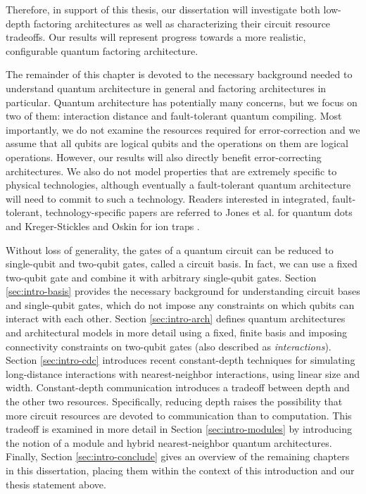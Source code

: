  Therefore,
in support of this thesis,
our dissertation will investigate both low-depth factoring architectures
as well as characterizing their circuit resource tradeoffs.
Our results will represent progress towards a more realistic, configurable
quantum factoring architecture.


The remainder of this chapter is devoted to the necessary background needed
to understand quantum architecture in general and factoring architectures
in particular. Quantum architecture has potentially many concerns, but we
focus on two of them: interaction distance and fault-tolerant quantum compiling.
Most importantly, we do not examine the resources required for error-correction
and we assume that all qubits are logical qubits and the operations on them
are logical operations. However, our results will also directly benefit
error-correcting architectures. We also do not model properties that are extremely
specific to physical technologies, although eventually a
fault-tolerant quantum architecture will need to commit to such a technology.
Readers interested in integrated, fault-tolerant,
technology-specific papers are referred
to Jones et al. for quantum dots \cite{Jones2010}
and Kreger-Stickles and Oskin for ion traps \cite{Kreger-Stickles2008}.

Without loss of generality, the gates of a quantum circuit can be reduced to
single-qubit and two-qubit gates, called a circuit basis.
In fact, we can use a fixed two-qubit gate
and combine it with arbitrary single-qubit gates.
Section \ref{sec:intro-basis} provides the necessary background for
understanding circuit bases and single-qubit gates,
which do not impose any constraints on
which qubits can interact with each other. Section \ref{sec:intro-arch}
defines quantum architectures and architectural models in more detail using a
fixed, finite basis
and imposing connectivity constraints on two-qubit gates (also
described as \emph{interactions}).
Section \ref{sec:intro-cdc} introduces recent constant-depth techniques
for simulating long-distance interactions with nearest-neighbor
interactions, using linear size and width. Constant-depth communication
introduces a tradeoff between depth and the other two resources. Specifically,
reducing depth raises the possibility that more circuit resources are
devoted to communication than to computation. This tradeoff is examined 
in more detail in Section \ref{sec:intro-modules}
by introducing the notion of a module and hybrid nearest-neighbor
quantum architectures.
Finally, Section \ref{sec:intro-conclude}
gives an overview of the remaining chapters in this dissertation,
placing them within the context of this introduction and our thesis statement
above.










